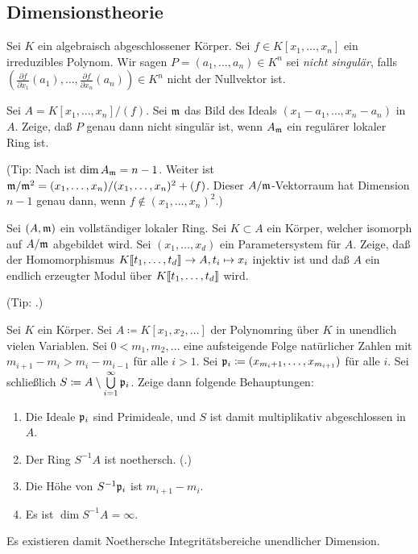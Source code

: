 \subsection{Dimensionstheorie}

\begin{exercise}
	Sei \(K\) ein algebraisch abgeschlossener Körper. Sei \(f \in K[x_1, \dotsc, x_n]\) ein irreduzibles Polynom.
	Wir sagen \(P = (a_1, \dotsc, a_n) \in K^n\) sei \emph{nicht singulär}, falls \((\frac{\partial f}{\partial x_1}(a_1),
	\dotsc, \frac{\partial f}{\partial x_n}(a_n)) \in K^n\) nicht der Nullvektor ist.
	
	Sei \(A = K[x_1, \dotsc, x_n]/(f)\). 
	Sei \(\mathfrak{m}\) das Bild des Ideals \((x_1 - a_1, \dotsc, x_n - a_n)\) in \(A\). Zeige, daß \(P\)
	genau dann nicht singulär ist, wenn \(A_{\mathfrak{m}}\) ein regulärer lokaler Ring ist.
	
	(Tip: Nach  ist \(\dim A_{\mathfrak{m}} = n - 1\). Weiter ist
	\(\mathfrak{m}/\mathfrak{m}^2 = (x_1, \dotsc, x_n)/(x_1, \dotsc, x_n)^2 + (f)\). Dieser \(A/\mathfrak{m}\)-Vektorraum
	hat Dimension \(n - 1\) genau dann, wenn \(f \notin (x_1, \dotsc, x_n)^2\).)
\end{exercise}

\begin{exercise}
	Sei \((A, \mathfrak{m})\) ein vollständiger lokaler Ring. Sei \(K \subset A\) ein Körper, welcher isomorph auf
	\(A/\mathfrak{m}\) abgebildet wird. Sei \((x_1, \dotsc, x_d)\) ein Parametersystem für \(A\). Zeige, daß der
	Homomorphismus
	\(K\llbracket t_1, \dotsc, t_d\rrbracket \to A, t_i \mapsto x_i\) injektiv ist und daß \(A\) ein endlich erzeugter Modul über
	\(K\llbracket t_1, \dotsc, t_d\rrbracket\) wird.
	
	(Tip: .)
\end{exercise}

\begin{exercise}
	Sei \(K\) ein Körper. Sei \(A \coloneqq K[x_1, x_2, \dotsc]\) der Polynomring über \(K\) in unendlich
	vielen Variablen. Sei \(0 < m_1, m_2, \dotsc\) eine aufsteigende Folge natürlicher Zahlen mit \(m_{i + 1} - m_i
	> m_{i} - m_{i - 1}\) für alle \(i > 1\). Sei \(\mathfrak{p}_i \coloneqq (x_{m_i + 1}, \dotsc, x_{m_{i + 1}})\) für
	alle \(i\). Sei schließlich \(S \coloneqq A \setminus \bigcup\limits_{i = 1}^\infty \mathfrak{p}_i\).
	Zeige dann folgende Behauptungen:
	\begin{enumerate}
	\item
		Die Ideale \(\mathfrak{p}_i\) sind Primideale, und \(S\) ist damit multiplikativ abgeschlossen in \(A\).
	\item
		Der Ring \(S^{-1} A\) ist noethersch. (.)
	\item
		Die Höhe von \(S^{-1} \mathfrak{p}_i\) ist \(m_{i + 1} - m_i\).
	\item
		Es ist \(\dim S^{-1} A = \infty\).
	\end{enumerate}
	Es existieren damit Noethersche Integritätsbereiche unendlicher Dimension.
\end{exercise}

